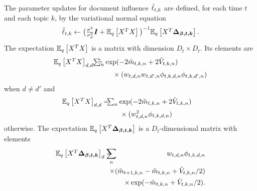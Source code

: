 The parameter updates for document influence $\tilde{\ell}_{t,k}$ are
defined, for each time $t$ and each topic $k$, by the
variational normal equation
\[
\tilde{\ell}_{t, k} \gets \big( \textstyle \frac{\sigma^2}{\sigma^2_{d}} \bm I
  + \mathbb{E}_q\left[X^T X\right] \big)^{-1} \mathbb{E}_q\left[X^T \bm{\Delta_{\beta,t,k}}\right].
\]
The expectation $\mathbb{E}_q\left[X^TX\right]$ is a matrix with dimension $D_t \times D_t$.  Its elements are
\begin{eqnarray*}
\textstyle {\expectq{X^T X}}_{d,d'} = & \hspace{-15pt} \textstyle \sum_n \exp(-2\mv_{t,k,n} + 2 \vv_{t,k,n}) \\
\textstyle  & \hspace{14pt} \times (w_{t,d,n} w_{t,d',n} \phi_{t,k,d,n } \phi_{t,k,d',n})
\vspace{-20pt}
\end{eqnarray*}
when $d \neq d'$ and
\begin{eqnarray*}
\vspace{-20pt}
\hspace{-10pt} \textstyle {\expectq{X^T X}}_{d,d} = & \hspace{-5pt} \textstyle \sum_n \exp(-2\mv_{t,k,n} + 2 \vv_{t,k,n}) \\
\textstyle  & \hspace{15pt} \times (w_{t,d,n}^2 \phi_{t,k,d,n}) \\
\end{eqnarray*}
otherwise. The expectation $\mathbb{E}_q\left[X^T \bm{\Delta_{\beta,t,k}}\right]$
is a $D_t$-dimensional matrix with elements
\begin{eqnarray*}
\textstyle {\expectq{X^T \bm{\Delta_{\beta,t,k}}}}_d = & \hspace{-10pt} \sum_n & \hspace{-10pt} w_{t,d,n} \phi_{t,k,d,n} \nonumber \\
\textstyle && \hspace{-20pt} \times (\mv_{t+1,k,n} - \mv_{t,k,n} + \vv_{t,k,n}/2) \nonumber \\
\textstyle && \hspace{-20pt} \times \exp(-\mv_{t,k,n} + \vv_{t,k,n}/2). \nonumber
\end{eqnarray*}

